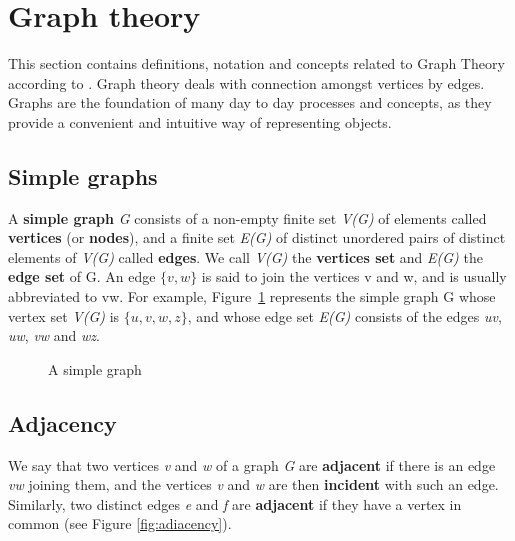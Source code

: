 \section{Graph theory}
This section contains definitions, notation and concepts related to Graph Theory according
to \cite{graph_theory:2010}.
Graph theory deals with connection amongst vertices by edges.
Graphs are the foundation of many day to day processes and concepts, as they provide a convenient
and intuitive way of representing objects.

\subsection{Simple graphs}
A \textbf{simple graph} \textit{G} consists of a non-empty finite set \textit{V(G)} of elements called \textbf{vertices}
(or \textbf{nodes}), and a finite set \textit{E(G)} of distinct unordered pairs of distinct elements of \textit{V(G)}
called \textbf{edges}. We call \textit{V(G)} the \textbf{vertices set} and \textit{E(G)} the \textbf{edge set} of G.
An edge $\{\textit{v}, \textit{w}\}$ is said to join the vertices v and w, and is usually abbreviated to vw. For example, Figure~\ref{fig:simple_graph} represents the simple graph G whose vertex set \textit{V(G)} is $\{\textit{u}, \textit{v}, \textit{w}, \textit{z}\}$, and whose
edge set \textit{E(G)} consists of the edges \textit{uv}, \textit{uw}, \textit{vw} and \textit{wz}. 

\begin{figure}[H]
    \centering
    \caption{A simple graph}
    \label{fig:simple_graph}
\end{figure}

\subsection{Adjacency}
We say that two vertices \textit{v} and \textit{w} of a graph \textit{G} are \textbf{adjacent} if there is an edge \textit{vw} joining them, and the vertices \textit{v} and \textit{w} are then \textbf{incident} with such an edge. \\
Similarly, two distinct edges \textit{e} and \textit{f} are \textbf{adjacent} if they have a vertex in common (see Figure \ref{fig:adiacency}).

